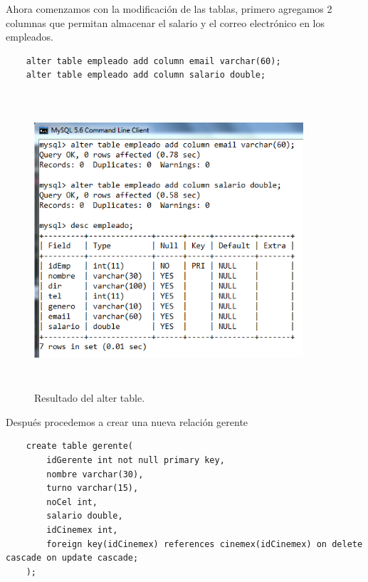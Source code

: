 \documentclass[12pt, titlepage]{article}
\begin{document}
    Ahora comenzamos con la modificación de las tablas, primero agregamos 2 columnas que permitan almacenar el salario y el correo electrónico en los empleados.
    \begin{lstlisting}
    alter table empleado add column email varchar(60);
    alter table empleado add column salario double;
    \end{lstlisting}
    \begin{figure}[H]
        \begin{center}
            \includegraphics[width=10cm, height=11cm]{img/alter-table.png}
            \caption{Resultado del alter table.}
            \label{fig:arlter}
        \end{center}
    \end{figure}
    Después procedemos a crear una nueva relación gerente
     \begin{lstlisting}
    create table gerente(
        idGerente int not null primary key,
        nombre varchar(30),
        turno varchar(15),
        noCel int,
        salario double,
        idCinemex int,
        foreign key(idCinemex) references cinemex(idCinemex) on delete cascade on update cascade;
    );
    \end{lstlisting}
\end{document}
